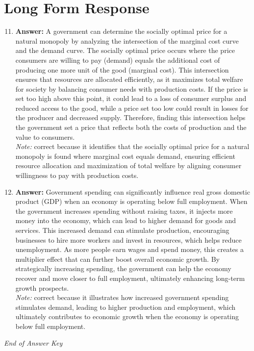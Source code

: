 \documentclass[12pt]{article}
\begin{document}
\section*{Long Form Response}
\begin{enumerate}[label=\arabic*.]
\setcounter{enumi}{10}
\item \textbf{Answer:} A government can determine the socially optimal price for a natural monopoly by analyzing the intersection of the marginal cost curve and the demand curve. The socially optimal price occurs where the price consumers are willing to pay (demand) equals the additional cost of producing one more unit of the good (marginal cost). This intersection ensures that resources are allocated efficiently, as it maximizes total welfare for society by balancing consumer needs with production costs. If the price is set too high above this point, it could lead to a loss of consumer surplus and reduced access to the good, while a price set too low could result in losses for the producer and decreased supply. Therefore, finding this intersection helps the government set a price that reflects both the costs of production and the value to consumers.
\\ \textit{Note:} correct because it identifies that the socially optimal price for a natural monopoly is found where marginal cost equals demand, ensuring efficient resource allocation and maximization of total welfare by aligning consumer willingness to pay with production costs.
\item \textbf{Answer:} Government spending can significantly influence real gross domestic product (GDP) when an economy is operating below full employment. When the government increases spending without raising taxes, it injects more money into the economy, which can lead to higher demand for goods and services. This increased demand can stimulate production, encouraging businesses to hire more workers and invest in resources, which helps reduce unemployment. As more people earn wages and spend money, this creates a multiplier effect that can further boost overall economic growth. By strategically increasing spending, the government can help the economy recover and move closer to full employment, ultimately enhancing long-term growth prospects.
\\ \textit{Note:} correct because it illustrates how increased government spending stimulates demand, leading to higher production and employment, which ultimately contributes to economic growth when the economy is operating below full employment.
\end{enumerate}

\vfill
\noindent\textit{End of Answer Key}
\end{document}
